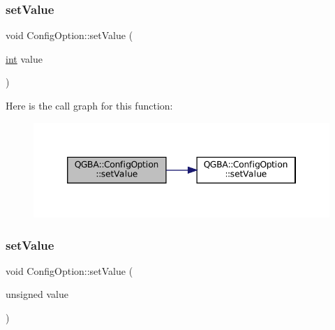 \subsubsection{\texorpdfstring{set\+Value}{setValue}\hspace{0.1cm}{\footnotesize\ttfamily [2/5]}}
{\footnotesize\ttfamily void Config\+Option\+::set\+Value (\begin{DoxyParamCaption}\item[{\mbox{\hyperlink{ioapi_8h_a787fa3cf048117ba7123753c1e74fcd6}{int}}}]{value }\end{DoxyParamCaption})\hspace{0.3cm}{\ttfamily [slot]}}

Here is the call graph for this function\+:
\nopagebreak
\begin{figure}[H]
\begin{center}
\leavevmode
\includegraphics[width=346pt]{class_q_g_b_a_1_1_config_option_a38e726eff29e2178fbad58c12104ae32_cgraph}
\end{center}
\end{figure}
\mbox{\label{class_q_g_b_a_1_1_config_option_a2b7c4b60aa27d09db06b13e73565991e}} 
\subsubsection{\texorpdfstring{set\+Value}{setValue}\hspace{0.1cm}{\footnotesize\ttfamily [3/5]}}
{\footnotesize\ttfamily void Config\+Option\+::set\+Value (\begin{DoxyParamCaption}\item[{unsigned}]{value }\end{DoxyParamCaption})\hspace{0.3cm}{\ttfamily [slot]}}

